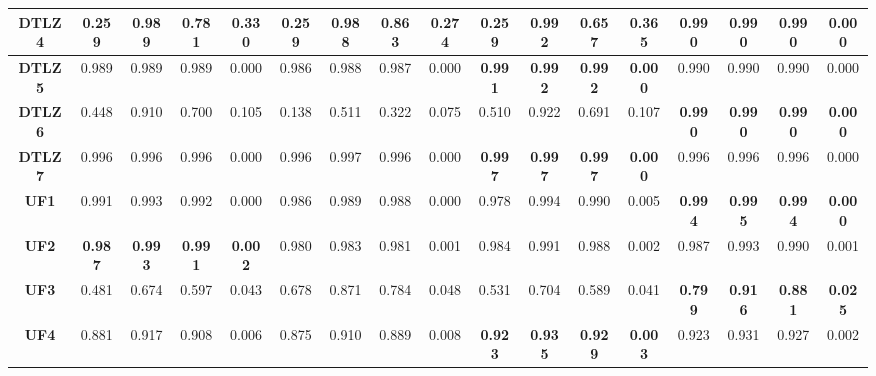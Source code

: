 \begin{table*}[t]
{\begin{tabular}{cc|c|c|c|c|c|c|c|c|c|c|c|c|c|c|c}
\multicolumn{1}{c|}{\textbf{DTLZ4}} & 0.259          & 0.989          & 0.781          & 0.330          & 0.259          & 0.988          & 0.863          & 0.274          & 0.259          & 0.992          & 0.657          & 0.365          & \textbf{0.990} & \textbf{0.990} & \textbf{0.990} & \textbf{0.000} \\ \hline
\multicolumn{1}{c|}{\textbf{DTLZ5}} & 0.989          & 0.989          & 0.989          & 0.000          & 0.986          & 0.988          & 0.987          & 0.000          & \textbf{0.991} & \textbf{0.992} & \textbf{0.992} & \textbf{0.000} & 0.990          & 0.990          & 0.990          & 0.000          \\ \hline
\multicolumn{1}{c|}{\textbf{DTLZ6}} & 0.448          & 0.910          & 0.700          & 0.105          & 0.138          & 0.511          & 0.322          & 0.075          & 0.510          & 0.922          & 0.691          & 0.107          & \textbf{0.990} & \textbf{0.990} & \textbf{0.990} & \textbf{0.000} \\ \hline
\multicolumn{1}{c|}{\textbf{DTLZ7}} & 0.996          & 0.996          & 0.996          & 0.000          & 0.996          & 0.997          & 0.996          & 0.000          & \textbf{0.997} & \textbf{0.997} & \textbf{0.997} & \textbf{0.000} & 0.996          & 0.996          & 0.996          & 0.000          \\ \hline
\multicolumn{1}{c|}{\textbf{UF1}}   & 0.991          & 0.993          & 0.992          & 0.000          & 0.986          & 0.989          & 0.988          & 0.000          & 0.978          & 0.994          & 0.990          & 0.005          & \textbf{0.994} & \textbf{0.995} & \textbf{0.994} & \textbf{0.000} \\ \hline
\multicolumn{1}{c|}{\textbf{UF2}}   & \textbf{0.987} & \textbf{0.993} & \textbf{0.991} & \textbf{0.002} & 0.980          & 0.983          & 0.981          & 0.001          & 0.984          & 0.991          & 0.988          & 0.002          & 0.987          & 0.993          & 0.990          & 0.001          \\ \hline
\multicolumn{1}{c|}{\textbf{UF3}}   & 0.481 	     & 0.674 	      & 0.597          & 0.043          & 0.678          & 0.871          & 0.784          & 0.048          & 0.531          & 0.704          & 0.589          & 0.041          & \textbf{0.799} & \textbf{0.916} & \textbf{0.881} & \textbf{0.025} \\ \hline
\multicolumn{1}{c|}{\textbf{UF4}}   & 0.881          & 0.917          & 0.908          & 0.006          & 0.875          & 0.910          & 0.889          & 0.008          & \textbf{0.923} & \textbf{0.935} & \textbf{0.929} & \textbf{0.003} & 0.923          & 0.931          & 0.927          & 0.002          \\ \hline

\end{tabular}}
\end{table*}
